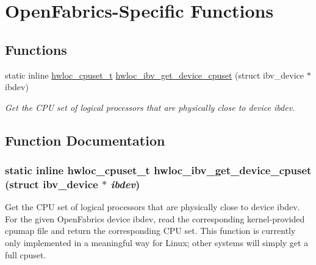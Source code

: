 \hypertarget{group__hwloc__openfabrics}{
\section{OpenFabrics-\/Specific Functions}
\label{group__hwloc__openfabrics}
}
\subsection*{Functions}
\begin{DoxyCompactItemize}
\item 
static inline \hyperlink{group__hwlocality__cpuset_ga7366332f7090f5b54d4b25a0c2c4b411}{hwloc\_\-cpuset\_\-t} \hyperlink{group__hwloc__openfabrics_ga8fcd1418f29faf453ed502fb11172465}{hwloc\_\-ibv\_\-get\_\-device\_\-cpuset} (struct ibv\_\-device $\ast$ibdev)
\begin{DoxyCompactList}\small\item\em Get the CPU set of logical processors that are physically close to device {\ttfamily ibdev}. \item\end{DoxyCompactList}\end{DoxyCompactItemize}


\subsection{Function Documentation}
\hypertarget{group__hwloc__openfabrics_ga8fcd1418f29faf453ed502fb11172465}{
\subsubsection[{hwloc\_\-ibv\_\-get\_\-device\_\-cpuset}]{\setlength{\rightskip}{0pt plus 5cm}static inline {\bf hwloc\_\-cpuset\_\-t} hwloc\_\-ibv\_\-get\_\-device\_\-cpuset (struct ibv\_\-device $\ast$ {\em ibdev})}}
\label{group__hwloc__openfabrics_ga8fcd1418f29faf453ed502fb11172465}


Get the CPU set of logical processors that are physically close to device {\ttfamily ibdev}. For the given OpenFabrics device {\ttfamily ibdev}, read the corresponding kernel-\/provided cpumap file and return the corresponding CPU set. This function is currently only implemented in a meaningful way for Linux; other systems will simply get a full cpuset. 
